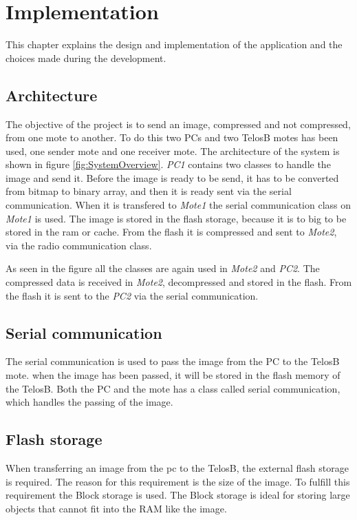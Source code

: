 \chapter{Implementation}
\label{chp:impl}

This chapter explains the design and implementation of the application and the choices made during the development.

\section{Architecture}
The objective of the project is to send an image, compressed and not compressed, from one mote to another. To do this two PCs and two TelosB motes has been used, one sender mote and one receiver mote. The architecture of the system is shown in figure \ref{fig:SystemOverview}. \emph{PC1} contains two classes to handle the image and send it. Before the image is ready to be send, it has to be converted from bitmap to binary array, and then it is ready sent via the serial communication. When it is transfered to \emph{Mote1} the serial communication class on \emph{Mote1} is used. The image is stored in the flash storage, because it is to big to be stored in the ram or cache. From the flash it is compressed and sent to \emph{Mote2}, via the radio communication class.


As seen in the figure all the classes are again used in \emph{Mote2} and \emph{PC2}. The compressed data is received in \emph{Mote2}, decompressed and stored in the flash. From the flash it is sent to the \emph{PC2} via the serial communication. 

\section{Serial communication}
The serial communication is used to pass the image from the PC to the TelosB mote. when the image has been passed, it will be stored in the flash memory of the TelosB. Both the PC and the mote has a class called serial communication, which handles the passing of the image.

\section{Flash storage}
When transferring an image from the pc to the TelosB, the external flash storage is required. The reason for this requirement is the size of the image. To fulfill this requirement the Block storage is used. The Block storage is ideal for storing large objects that cannot fit into the RAM like the image.

